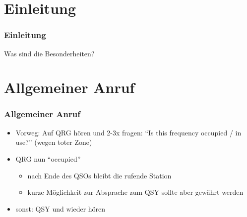 

\subtitle{Betriebstechnik/Vorschriften 10: \\
  Betriebsabwicklung auf Kurzwelle \\[2em]}
\date{Stand 18.09.2017}


\section{Einleitung}

\begin{frame}
  \frametitle{Einleitung}

  Was sind die Besonderheiten?

\end{frame}

\section{Allgemeiner Anruf}

\begin{frame}
  \frametitle{Allgemeiner Anruf}

  \begin{itemize}
    \item Vorweg: Auf QRG hören und 2-3x fragen: ``Is this frequency occupied /
      in use?'' (wegen toter Zone)
    \item QRG nun ``occupied''
      \begin{itemize}
        \item nach Ende des QSOs bleibt die rufende Station
        \item kurze Möglichkeit zur Absprache zum QSY sollte aber gewährt werden
      \end{itemize}
    \item sonst: QSY und wieder hören
  \end{itemize}

\end{frame}

